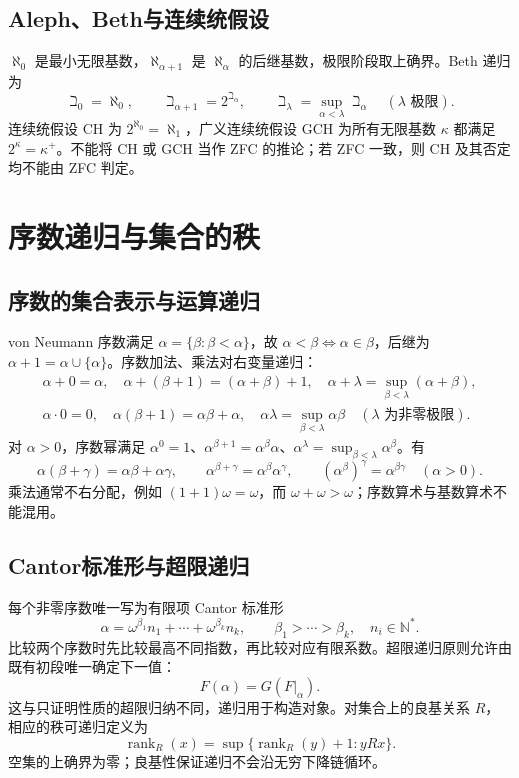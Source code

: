 \documentclass[../main.tex]{subfiles}
\begin{document}
\subsection{Aleph、Beth与连续统假设}
$\aleph_0$ 是最小无限基数，$\aleph_{\alpha+1}$ 是 $\aleph_\alpha$ 的后继基数，极限阶段取上确界。Beth 递归为
\[
\beth_0=\aleph_0,\qquad\beth_{\alpha+1}=2^{\beth_\alpha},\qquad
\beth_\lambda=\sup_{\alpha<\lambda}\beth_\alpha\quad(\lambda\text{ 极限}).
\]
连续统假设 CH 为 $2^{\aleph_0}=\aleph_1$，广义连续统假设 GCH 为所有无限基数 $\kappa$ 都满足 $2^\kappa=\kappa^+$。不能将 CH 或 GCH 当作 ZFC 的推论；若 ZFC 一致，则 CH 及其否定均不能由 ZFC 判定。

\section{序数递归与集合的秩}
\subsection{序数的集合表示与运算递归}
von Neumann 序数满足 $\alpha=\{\beta:\beta<\alpha\}$，故 $\alpha<\beta\iff\alpha\in\beta$，后继为 $\alpha+1=\alpha\cup\{\alpha\}$。序数加法、乘法对右变量递归：
\begin{gather*}
\alpha+0=\alpha,\quad\alpha+(\beta+1)=(\alpha+\beta)+1,\quad
\alpha+\lambda=\sup_{\beta<\lambda}(\alpha+\beta),\\
\alpha\cdot0=0,\quad\alpha(\beta+1)=\alpha\beta+\alpha,\quad
\alpha\lambda=\sup_{\beta<\lambda}\alpha\beta\quad(\lambda\text{ 为非零极限}).
\end{gather*}
对 $\alpha>0$，序数幂满足 $\alpha^0=1$、$\alpha^{\beta+1}=\alpha^\beta\alpha$、$\alpha^\lambda=\sup_{\beta<\lambda}\alpha^\beta$。有
\[
\alpha(\beta+\gamma)=\alpha\beta+\alpha\gamma,\qquad
\alpha^{\beta+\gamma}=\alpha^\beta\alpha^\gamma,\qquad
(\alpha^\beta)^\gamma=\alpha^{\beta\gamma}\quad(\alpha>0).
\]
乘法通常不右分配，例如 $(1+1)\omega=\omega$，而 $\omega+\omega>\omega$；序数算术与基数算术不能混用。

\subsection{Cantor标准形与超限递归}
每个非零序数唯一写为有限项 Cantor 标准形
\[
\alpha=\omega^{\beta_1}n_1+\cdots+\omega^{\beta_k}n_k,
\qquad\beta_1>\cdots>\beta_k,\quad n_i\in\mathbb N^*.
\]
比较两个序数时先比较最高不同指数，再比较对应有限系数。超限递归原则允许由既有初段唯一确定下一值：
\[
F(\alpha)=G(F|_\alpha).
\]
这与只证明性质的超限归纳不同，递归用于构造对象。对集合上的良基关系 $R$，相应的秩可递归定义为
\[
\operatorname{rank}_R(x)=\sup\{\operatorname{rank}_R(y)+1:yRx\}.
\]
空集的上确界为零；良基性保证递归不会沿无穷下降链循环。
\end{document}
